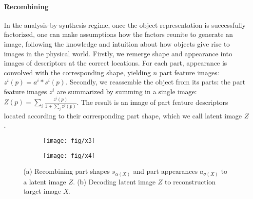 \paragraph{Recombining}
In the analysis-by-synthesis regime, once the object representation is successfully factorized, one can make assumptions how the factors reunite to generate an image, following the knowledge and intuition about how objects give rise to images in the physical world.
Firstly, we remerge shape and appearance into images of descriptors at the correct locations. For each part, appearance is convolved with the corresponding shape, yielding $n$ part feature images: $z^i(p) = a^i * s^i(p)$.
Secondly, we reassemble the object from its parts: the part feature images $z^i$ are summarized by summing in a single image: $ Z(p) = \sum_i \frac{z^i(p)}{1 + \sum_j z^j(p)}$. The result is an image of part feature descriptors located according to their corresponding part shape, which we call latent image $Z$.

\begin{figure}[!h]
\begin{subfigure}{0.5\linewidth}
\centering
\texttt{[image: fig/x3]}\caption{}
\label{fig:x3}
\end{subfigure}
\begin{subfigure}{0.4\linewidth}
\centering
\texttt{[image: fig/x4]}\caption{}
\label{fig:x4}
\end{subfigure}
\caption{ \small{(a) Recombining part shapes $s_{\alpha(X)}$ and part appearances $a_{\sigma(X)}$ to a latent image $Z$.
(b) Decoding latent image $Z$ to reconstruction target image $X$.}}
\label{fig:decoding}
\end{figure}

